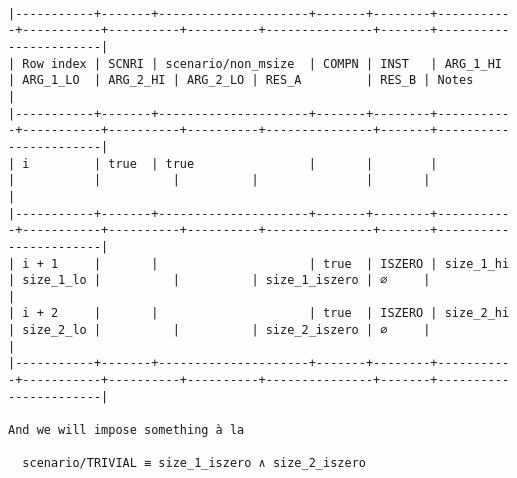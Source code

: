 \documentclass[varwidth=\maxdimen,margin=0.5cm,multi={verbatim}]{standalone}
\begin{document}
\begin{verbatim}

|-----------+-------+---------------------+-------+--------+-----------+-----------+----------+----------+---------------+-------+-----------------------|
| Row index | SCNRI | scenario/non_msize  | COMPN | INST   | ARG_1_HI  | ARG_1_LO  | ARG_2_HI | ARG_2_LO | RES_A         | RES_B | Notes                 |
|-----------+-------+---------------------+-------+--------+-----------+-----------+----------+----------+---------------+-------+-----------------------|
| i         | true  | true                |       |        |           |           |          |          |               |       |                       |
|-----------+-------+---------------------+-------+--------+-----------+-----------+----------+----------+---------------+-------+-----------------------|
| i + 1     |       |                     | true  | ISZERO | size_1_hi | size_1_lo |          |          | size_1_iszero | ∅     |                       |
| i + 2     |       |                     | true  | ISZERO | size_2_hi | size_2_lo |          |          | size_2_iszero | ∅     |                       |
|-----------+-------+---------------------+-------+--------+-----------+-----------+----------+----------+---------------+-------+-----------------------|

And we will impose something à la

  scenario/TRIVIAL ≡ size_1_iszero ∧ size_2_iszero

\end{verbatim}
\end{document}
